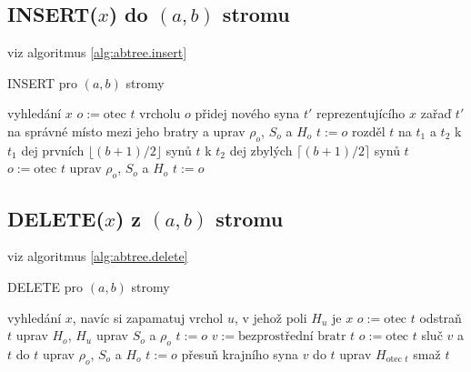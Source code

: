\subsection{INSERT($x$) do $(a,b)$ stromu}

viz algoritmus \ref{alg:abtree.insert}

\begin{algorithm}[!htb]
\caption{INSERT pro $(a,b)$ stromy}
\label{alg:abtree.insert}
\begin{algorithmic}
\STATE vyhledání $x$
	\STATE $o := \text{otec } t$
	\STATE vrcholu $o$ přidej nového syna $t'$ 
	reprezentujícího $x$
	\STATE zařaď $t'$ na správné místo mezi jeho bratry
	a uprav $\rho_o$, $S_o$ a $H_o$
	\STATE $t := o$
		\STATE {}
		\STATE rozděl $t$ na $t_1$ a $t_2$ 
		\STATE \quad k $t_1$ dej prvních 
			$\lfloor (b+1)/2 \rfloor$ synů $t$
		\STATE \quad k $t_2$ dej zbylých 
			$\lceil (b+1)/2 \rceil$ synů $t$
		\STATE $o := \text{otec } t$
		\STATE uprav $\rho_o$, $S_o$ a $H_o$
		\STATE {}
		\STATE $t := o$
	\ENDWHILE
\ENDIF
\end{algorithmic}
\end{algorithm}

\subsection{DELETE($x$) z $(a,b)$ stromu}

viz algoritmus \ref{alg:abtree.delete}

\begin{algorithm}[!htb]
\caption{DELETE pro $(a,b)$ stromy}
\label{alg:abtree.delete}
\begin{algorithmic}
\STATE vyhledání $x$, navíc si zapamatuj vrchol $u$, 
	v jehož poli $H_u$ je $x$
	\STATE $o := \text{otec } t$
	\STATE odstraň $t$
	\STATE uprav $H_o$, $H_u$ 
	\STATE uprav $S_o$ a $\rho_o$
	\STATE $t := o$
		\STATE $v := \text{bezprostřední bratr } t$ 
			\STATE {}
			\STATE $o := \text{otec } t$
			\STATE sluč $v$ a $t$ do $t$
			\STATE uprav $\rho_o$, $S_o$ a $H_o$
			\STATE $t := o$
			\STATE {}
			\STATE přesuň krajního syna $v$ do $t$
			\STATE uprav $H_{\text{otec } t}$
		\ENDIF
	\ENDWHILE
		\STATE smaž $t$
	\ENDIF
\ENDIF
\end{algorithmic}
\end{algorithm}

